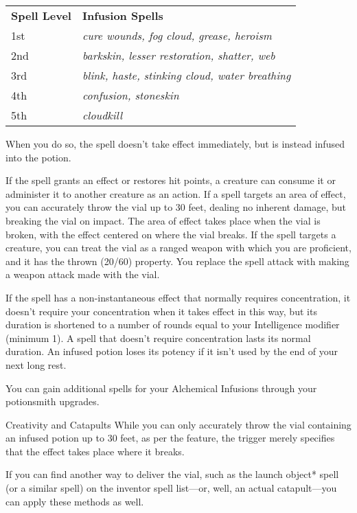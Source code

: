\documentclass[11pt,twoside,openany]{book}  %
\begin{document}
\vspace{1pt}
\begin{SmallTableBox}
\small %
\renewcommand{\arraystretch}{1.2}
\begin{tabularx}{\linewidth}{@{}>{\raggedright\arraybackslash}p{2.5cm}X@{}}
\rowcolor{TableHeader}
\textbf{Spell Level} & \textbf{Infusion Spells} \\
1st  & \textit{cure wounds, fog cloud, grease, heroism} \\
2nd  & \textit{barkskin, lesser restoration, shatter, web} \\
3rd  & \textit{blink, haste, stinking cloud, water breathing} \\
4th  & \textit{confusion, stoneskin} \\
5th  & \textit{cloudkill} \\
\end{tabularx}
\end{SmallTableBox}
\vspace{1pt}

When you do so, the spell doesn’t take effect immediately, but is instead infused into the potion.

If the spell grants an effect or restores hit points, a creature can consume it or administer it to another creature as an action. If a spell targets an area of effect, you can accurately throw the vial up to 30 feet, dealing no inherent damage, but breaking the vial on impact. The area of effect takes place when the vial is broken, with the effect centered on where the vial breaks. If the spell targets a creature, you can treat the vial as a ranged weapon with which you are proficient, and it has the thrown (20/60) property. You replace the spell attack with making a weapon attack made with the vial.

If the spell has a non-instantaneous effect that normally requires concentration, it doesn’t require your concentration when it takes effect in this way, but its duration is shortened to a number of rounds equal to your Intelligence modifier (minimum 1). A spell that doesn’t require concentration lasts its normal duration. An infused potion loses its potency if it isn’t used by the end of your next long rest.

You can gain additional spells for your Alchemical Infusions through your potionsmith upgrades.
\begin{CalloutBox}{Creativity and Catapults}
While you can only accurately throw the vial containing an infused potion up to 30 feet, as per the feature, the trigger merely specifies that the effect takes place where it breaks.

If you can find another way to deliver the vial, such as the launch object* spell (or a similar spell) on the inventor spell list—or, well, an actual catapult—you can apply these methods as well.
\end{CalloutBox}
\end{document}
